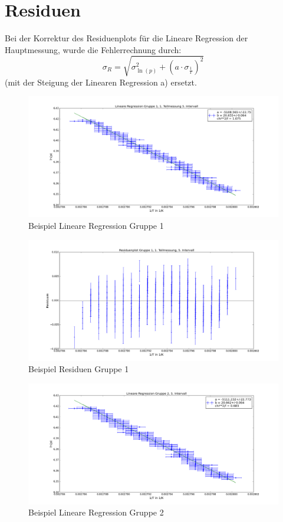 \documentclass[12pt,a4paper]{article}
\author{Gruppe C14 \\ Julián Häck, Martin Koytek, Lars Wenning, Erik Zimmermann}
\begin{document}
\section{Residuen}
Bei der Korrektur des Residuenplots für die Lineare Regression der Hauptmessung, wurde die Fehlerrechnung durch:
\begin{equation}
\sigma_R=\sqrt{\sigma_{\ln(p)}^2+(a\cdot \sigma_{\frac{1}{T}})^2}
\end{equation}
(mit der Steigung der Linearen Regression a) ersetzt. 
\begin{figure}[H]
\centering
\includegraphics[scale=0.4]{G1_Intervall5_LinReg.png}
\caption{Beispiel Lineare Regression Gruppe 1}
\end{figure}
\begin{figure}[H]
\centering
\includegraphics[scale=0.4]{G1_Intervall5_Residuen.png}
\caption{Beispiel Residuen Gruppe 1}
\end{figure}
\begin{figure}[H]
\centering
\includegraphics[scale=0.4]{G2_Intervall5_LinReg.png}
\caption{Beispiel Lineare Regression Gruppe 2}
\end{figure}
\end{document}
